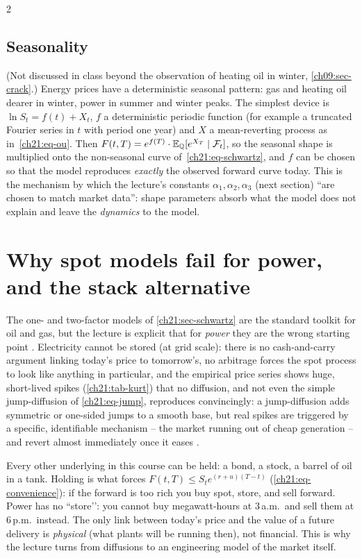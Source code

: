 \begin{paracol}{2}
\subsection{Seasonality}\label{ch21:sec-season}
(Not discussed in class beyond the observation of heating oil in winter, \cref{ch09:sec-crack}.) Energy prices have a deterministic seasonal pattern: gas and heating oil dearer in winter, power in summer and winter peaks. The simplest device is $\ln S_t=f(t)+X_t$, $f$ a deterministic periodic function (for example a truncated Fourier series in $t$ with period one year) and $X$ a mean-reverting process as
in~\eqref{ch21:eq-ou}. Then $F(t,T)=e^{f(T)}\cdot\mathbb{E}_{\mathbb{Q}}[e^{X_T}\mid\mathcal F_t]$, so the seasonal shape is multiplied onto the non-seasonal curve of~\eqref{ch21:eq-schwartz}, and $f$ can be chosen so that the model reproduces \emph{exactly} the observed forward curve today. This is the mechanism by which the lecture's constants
$\alpha_1,\alpha_2,\alpha_3$ (next section) ``are chosen to match market data'': shape parameters absorb what the model does not explain and leave the \emph{dynamics} to the model.

\section{Why spot models fail for power, and the stack alternative}\label{ch21:sec-stack}

The one- and two-factor models of \cref{ch21:sec-schwartz} are the standard toolkit for oil and gas, but the lecture is explicit that for \emph{power} they are the wrong starting point
. Electricity cannot be stored (at grid scale): there is no cash-and-carry argument linking today's price to tomorrow's, no arbitrage forces the spot process to
look like anything in particular, and the empirical price series shows huge, short-lived spikes (\cref{ch21:tab-kurt}) that no diffusion, and not even the simple jump-diffusion
of \eqref{ch21:eq-jump}, reproduces convincingly: a jump-diffusion adds symmetric or one-sided jumps to a smooth base, but real spikes are triggered by a specific, identifiable
mechanism -- the market running out of cheap generation -- and revert almost immediately once it eases .

\begin{intuition}
Every other underlying in this course can be held: a bond, a stock, a barrel of oil in a tank. Holding is what forces $F(t,T)\le S_te^{(r+u)(T-t)}$ (\cref{ch21:eq-convenience}):
if the forward is too rich you buy spot, store, and sell forward. Power has no ``store’’: you cannot buy megawatt-hours at 3\,a.m.\ and sell them at 6\,p.m.\ instead. The only
link between today's price and the value of a future delivery is \emph{physical} (what plants will be running then), not financial. This is why the lecture turns from
diffusions to an engineering model of the market itself.
\end{intuition}


\end{paracol}
